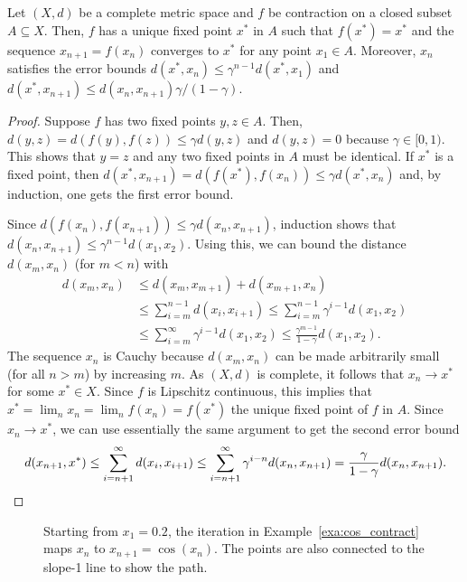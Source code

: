 \begin{theorem}
Let $(X,d)$ be a complete metric space and $f$ be contraction on a closed subset $A \subseteq X$.
Then, $f$ has a unique fixed point $x^*$ in $A$ such that $f(x^*) = x^*$ and the sequence $x_{n+1} = f(x_n)$ converges to $x^*$ for any point $x_1 \in A$.  Moreover, $x_n$ satisfies the error bounds $d(x^*,x_n) \leq \gamma^{n-1} d(x^*,x_1)$ and $d(x^*,x_{n+1}) \leq d(x_n,x_{n+1})\gamma /(1-\gamma)$.
\end{theorem}
\begin{proof}
Suppose $f$ has two fixed points $y,z\in A$.
Then, $d(y,z) = d \left(f(y),f(z) \right) \leq \gamma  d(y,z)$ and $d(y,z) = 0$ because $\gamma \in [0,1)$.
This shows that $y=z$ and any two fixed points in $A$ must be identical.
If $x^*$ is a fixed point, then $d(x^*,x_{n+1}) = d(f(x^*),f(x_{n})) \leq \gamma d(x^*,x_n)$ and, by induction, one gets the first error bound.

Since $d(f(x_n),f(x_{n+1})) \leq \gamma d(x_n,x_{n+1})$, induction shows that $d(x_n,x_{n+1}) \leq \gamma^{n-1} d(x_1,x_2)$.
Using this, we can bound the distance $d(x_m,x_n)$ (for $m<n$) with
\begin{align}
d(x_m,x_n)
& \leq d(x_m,x_{m+1}) + d(x_{m+1},x_n) \nonumber \\
& \leq \sum_{i=m}^{n-1} d(x_i,x_{i+1}) 
 \leq \sum_{i=m}^{n-1} \gamma^{i-1} d(x_1,x_2) \nonumber \\
& \leq \sum_{i=m}^\infty \gamma^{i-1} d(x_1,x_2) 
 \leq \frac{\gamma^{m-1}}{1-\gamma} d(x_1,x_2). \label{eq:contraction_error}
\end{align}
The sequence $x_n$ is Cauchy because $d(x_m,x_n)$ can be made arbitrarily small (for all $n>m$) by increasing $m$.
As $(X,d)$ is complete, it follows that $x_n \to x^*$ for some $x^* \in X$.
Since $f$ is Lipschitz continuous, this implies that $x^* = \lim_n x_n = \lim_n f(x_n) = f(x^*)$ the unique fixed point of $f$ in $A$.
Since $x_n \to x^*$, we can use essentially the same argument to get the second error bound
\[  d(x_{n+1},x^*) \leq \sum_{i=n+1}^{\infty} d(x_i,x_{i+1}) 
 \leq \sum_{i=n+1}^{\infty} \gamma^{i-n} d(x_n,x_{n+1}) = \frac{\gamma}{1-\gamma} d(x_n,x_{n+1}).\!  \qedhere \]
\end{proof}

\begin{figure}[t]
\centering

\vspace{-5mm}
\caption{\label{fig:cos_contract}Starting from $x_1 = 0.2$, the iteration in Example~\ref{exa:cos_contract} maps $x_n$ to $x_{n+1}= \cos(x_n)$.  The points are also connected to the slope-1 line to show the path.}
\end{figure}

